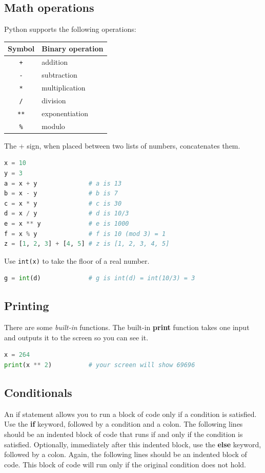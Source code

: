 \documentclass[11pt]{scrartcl}
\begin{document}
\subsection{Math operations}
Python supports the following operations:
\begin{center}
\begin{tabular}{cl}
    \toprule
    Symbol & Binary operation \\ \midrule
    \texttt{+} & addition \\
    \texttt{-} & subtraction \\
    \texttt{*} & multiplication \\
    \texttt{/} & division \\
    \texttt{**} & exponentiation \\
    \texttt{\%} & modulo \\
    \bottomrule
\end{tabular}
\end{center}
The + sign, when placed between two lists of numbers, concatenates them.
\begin{lstlisting}[language=Python]
x = 10
y = 3
a = x + y              # a is 13
b = x - y              # b is 7
c = x * y              # c is 30
d = x / y              # d is 10/3
e = x ** y             # e is 1000
f = x % y              # f is 10 (mod 3) = 1
z = [1, 2, 3] + [4, 5] # z is [1, 2, 3, 4, 5]
\end{lstlisting}
Use \texttt{int(x)} to take the floor of a real number.
\begin{lstlisting}[language=Python]
g = int(d)             # g is int(d) = int(10/3) = 3
\end{lstlisting}

\subsection{Printing}
There are some \emph{built-in} functions.
The built-in \textbf{print} function takes one input and outputs it to the screen so you can see it.
\begin{lstlisting}[language=Python]
x = 264
print(x ** 2)          # your screen will show 69696
\end{lstlisting}

\subsection{Conditionals}
An if statement allows you to run a block of code only if a condition is satisfied.
Use the \textbf{if} keyword, followed by a condition and a colon.
The following lines should be an indented block of code that runs if and only if the condition is satisfied.
Optionally, immediately after this indented block, use the \textbf{else} keyword, followed by a colon.
Again, the following lines should be an indented block of code.
This block of code will run only if the original condition does not hold.
\end{document}
